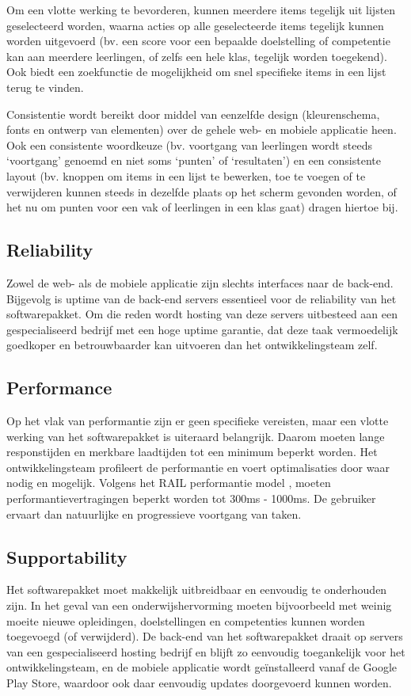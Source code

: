 \documentclass[a4paper]{article}
\begin{document}
Om een vlotte werking te bevorderen, kunnen meerdere items tegelijk uit lijsten geselecteerd worden, waarna acties op alle geselecteerde items tegelijk kunnen worden uitgevoerd (bv. een score voor een bepaalde doelstelling of competentie kan aan meerdere leerlingen, of zelfs een hele klas, tegelijk worden toegekend). Ook biedt een zoekfunctie de mogelijkheid om snel specifieke items in een lijst terug te vinden.

Consistentie wordt bereikt door middel van eenzelfde design (kleurenschema, fonts en ontwerp van elementen) over de gehele web- en mobiele applicatie heen. Ook een consistente woordkeuze (bv. voortgang van leerlingen wordt steeds `voortgang' genoemd en niet soms `punten' of `resultaten') en een consistente layout (bv. knoppen om items in een lijst te bewerken, toe te voegen of te verwijderen kunnen steeds in dezelfde plaats op het scherm gevonden worden, of het nu om punten voor een vak of leerlingen in een klas gaat) dragen hiertoe bij.


\subsection{Reliability}
Zowel de web- als de mobiele applicatie zijn slechts interfaces naar de back-end. Bijgevolg is uptime van de back-end servers essentieel voor de reliability van het softwarepakket. Om die reden wordt hosting van deze servers uitbesteed aan een gespecialiseerd bedrijf met een hoge uptime garantie, dat deze taak vermoedelijk goedkoper en betrouwbaarder kan uitvoeren dan het ontwikkelingsteam zelf.


\subsection{Performance}
Op het vlak van performantie zijn er geen specifieke vereisten, maar een vlotte werking van het softwarepakket is uiteraard belangrijk. Daarom moeten lange responstijden en merkbare laadtijden tot een minimum beperkt worden. Het ontwikkelingsteam profileert de performantie en voert optimalisaties door waar nodig en mogelijk. Volgens het RAIL performantie model \cite{RAIL}, moeten performantievertragingen beperkt worden tot 300ms - 1000ms. De gebruiker ervaart dan natuurlijke en progressieve voortgang van taken.


\subsection{Supportability}
Het softwarepakket moet makkelijk uitbreidbaar en eenvoudig te onderhouden zijn. In het geval van een onderwijshervorming moeten bijvoorbeeld met weinig moeite nieuwe opleidingen, doelstellingen en competenties kunnen worden toegevoegd (of verwijderd). De back-end van het softwarepakket draait op servers van een gespecialiseerd hosting bedrijf en blijft zo eenvoudig toegankelijk voor het ontwikkelingsteam, en de mobiele applicatie wordt geïnstalleerd vanaf de Google Play Store, waardoor ook daar eenvoudig updates doorgevoerd kunnen worden.
\end{document}
